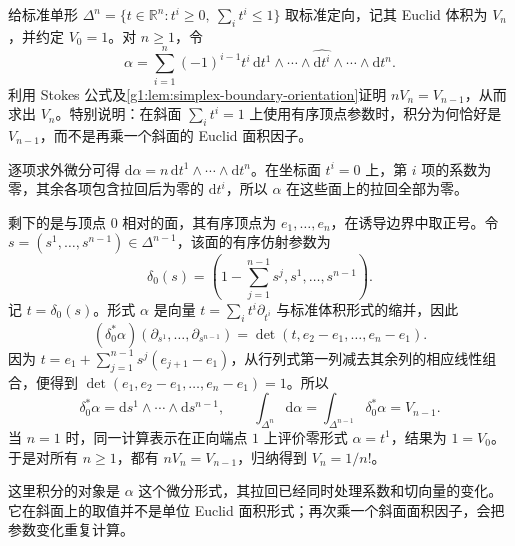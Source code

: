 \begin{exercise}\label{g1:ex:stokes-simplex-volume}
	给标准单形 \(\Delta^n=\{t\in\mathbb R^n:t^i\geq0,\ \sum_i t^i\leq1\}\) 取标准定向，记其 Euclid 体积为 \(V_n\)，并约定 \(V_0=1\)。对 \(n\geq1\)，令
	\[
		\alpha=\sum_{i=1}^n(-1)^{i-1}t^i\,\mathrm{d}t^1\wedge\cdots\wedge\widehat{\mathrm{d}t^i}\wedge\cdots\wedge\mathrm{d}t^n.
	\]
	利用 Stokes 公式及\cref{g1:lem:simplex-boundary-orientation}证明 \(nV_n=V_{n-1}\)，从而求出 \(V_n\)。特别说明：在斜面 \(\sum_i t^i=1\) 上使用有序顶点参数时，积分为何恰好是 \(V_{n-1}\)，而不是再乘一个斜面的 Euclid 面积因子。
\end{exercise}
\begin{solution}
	逐项求外微分可得 \(\mathrm{d}\alpha=n\,\mathrm{d}t^1\wedge\cdots\wedge\mathrm{d}t^n\)。在坐标面 \(t^i=0\) 上，第 \(i\) 项的系数为零，其余各项包含拉回后为零的 \(\mathrm{d}t^i\)，所以 \(\alpha\) 在这些面上的拉回全部为零。

	剩下的是与顶点 \(0\) 相对的面，其有序顶点为 \(e_1,\ldots,e_n\)，在诱导边界中取正号。令 \(s=(s^1,\ldots,s^{n-1})\in\Delta^{n-1}\)，该面的有序仿射参数为
	\[
		\delta_0(s)=\left(1-\sum_{j=1}^{n-1}s^j,s^1,\ldots,s^{n-1}\right).
	\]
	记 \(t=\delta_0(s)\)。形式 \(\alpha\) 是向量 \(t=\sum_i t^i\partial_{t^i}\) 与标准体积形式的缩并，因此
	\[
		(\delta_0^*\alpha)(\partial_{s^1},\ldots,\partial_{s^{n-1}})
		=\det(t,e_2-e_1,\ldots,e_n-e_1).
	\]
	因为 \(t=e_1+\sum_{j=1}^{n-1}s^j(e_{j+1}-e_1)\)，从行列式第一列减去其余列的相应线性组合，便得到 \(\det(e_1,e_2-e_1,\ldots,e_n-e_1)=1\)。所以
	\[
		\delta_0^*\alpha=\mathrm{d}s^1\wedge\cdots\wedge\mathrm{d}s^{n-1},\qquad
		\int_{\Delta^n}\mathrm{d}\alpha
		=\int_{\Delta^{n-1}}\delta_0^*\alpha=V_{n-1}.
	\]
	当 \(n=1\) 时，同一计算表示在正向端点 \(1\) 上评价零形式 \(\alpha=t^1\)，结果为 \(1=V_0\)。于是对所有 \(n\geq1\)，都有 \(nV_n=V_{n-1}\)，归纳得到 \(V_n=1/n!\)。

	这里积分的对象是 \(\alpha\) 这个微分形式，其拉回已经同时处理系数和切向量的变化。它在斜面上的取值并不是单位 Euclid 面积形式；再次乘一个斜面面积因子，会把参数变化重复计算。
\end{solution}

